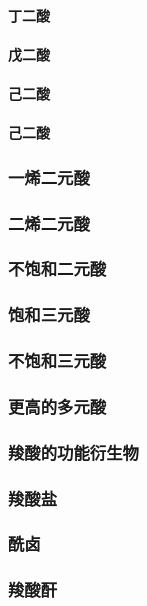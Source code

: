 \documentclass[UTF8]{../03-Chemistry}
\begin{document}
            \paragraph{丁二酸}
            \paragraph{戊二酸}
            \paragraph{己二酸}
            \paragraph{己二酸}
        \subsubsection{一烯二元酸}
        \subsubsection{二烯二元酸}
        \subsubsection{不饱和二元酸}
        \subsubsection{饱和三元酸}
        \subsubsection{不饱和三元酸}
        \subsubsection{更高的多元酸}
    \subsubsection{羧酸的功能衍生物}
        \subsubsection{羧酸盐}
        \subsubsection{酰卤}
        \subsubsection{羧酸酐}
\end{document}
